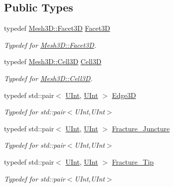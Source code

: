 \subsection*{Public Types}
\begin{DoxyCompactItemize}
\item 
typedef \hyperlink{classFVCode3D_1_1Mesh3D_1_1Facet3D}{Mesh3\+D\+::\+Facet3D} \hyperlink{classFVCode3D_1_1Rigid__Mesh_aafcadb25b9a244bc7beff08659a0e3cb}{Facet3D}
\begin{DoxyCompactList}\small\item\em Typedef for \hyperlink{classFVCode3D_1_1Mesh3D_1_1Facet3D}{Mesh3\+D\+::\+Facet3D}. \end{DoxyCompactList}\item 
typedef \hyperlink{classFVCode3D_1_1Mesh3D_1_1Cell3D}{Mesh3\+D\+::\+Cell3D} \hyperlink{classFVCode3D_1_1Rigid__Mesh_a0895aca7f04d8fc41dd933640735bbcf}{Cell3D}
\begin{DoxyCompactList}\small\item\em Typedef for \hyperlink{classFVCode3D_1_1Mesh3D_1_1Cell3D}{Mesh3\+D\+::\+Cell3D}. \end{DoxyCompactList}\item 
typedef std\+::pair$<$ \hyperlink{namespaceFVCode3D_a4bf7e328c75d0fd504050d040ebe9eda}{U\+Int}, \hyperlink{namespaceFVCode3D_a4bf7e328c75d0fd504050d040ebe9eda}{U\+Int} $>$ \hyperlink{classFVCode3D_1_1Rigid__Mesh_a396039ac2943822c4652967ce1849c9f}{Edge3D}
\begin{DoxyCompactList}\small\item\em Typedef for std\+::pair$<$\+U\+Int,\+U\+Int$>$ \end{DoxyCompactList}\item 
typedef std\+::pair$<$ \hyperlink{namespaceFVCode3D_a4bf7e328c75d0fd504050d040ebe9eda}{U\+Int}, \hyperlink{namespaceFVCode3D_a4bf7e328c75d0fd504050d040ebe9eda}{U\+Int} $>$ \hyperlink{classFVCode3D_1_1Rigid__Mesh_a7c7beee55763889ef7a4d0bc48392084}{Fracture\+\_\+\+Juncture}
\begin{DoxyCompactList}\small\item\em Typedef for std\+::pair$<$\+U\+Int,\+U\+Int$>$ \end{DoxyCompactList}\item 
typedef std\+::pair$<$ \hyperlink{namespaceFVCode3D_a4bf7e328c75d0fd504050d040ebe9eda}{U\+Int}, \hyperlink{namespaceFVCode3D_a4bf7e328c75d0fd504050d040ebe9eda}{U\+Int} $>$ \hyperlink{classFVCode3D_1_1Rigid__Mesh_a114241afca8d7f22e28397e6a59c931f}{Fracture\+\_\+\+Tip}
\begin{DoxyCompactList}\small\item\em Typedef for std\+::pair$<$\+U\+Int,\+U\+Int$>$ \end{DoxyCompactList}\item 

\end{DoxyCompactItemize}

